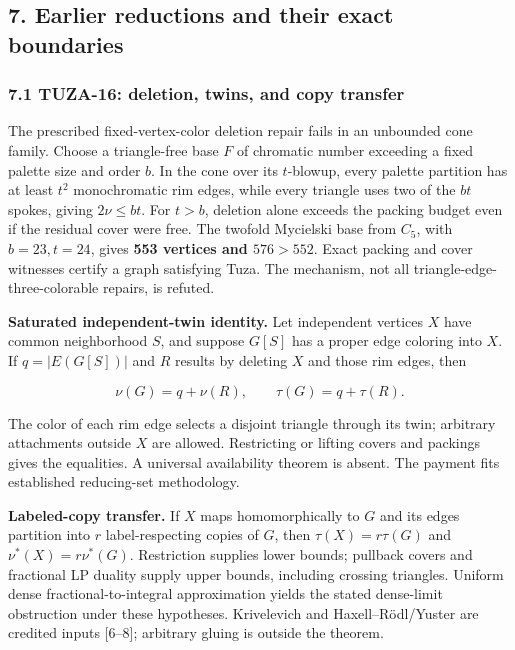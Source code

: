 \documentclass[11pt,a4paper]{article}
\begin{document}
\subsection{7. Earlier reductions and their exact boundaries}\label{earlier-reductions-and-their-exact-boundaries}

\subsubsection{7.1 TUZA-16: deletion, twins, and copy transfer}\label{tuza-16-deletion-twins-and-copy-transfer}

The prescribed fixed-vertex-color deletion repair fails in an unbounded cone family. Choose a triangle-free base \(F\) of chromatic number exceeding a fixed palette size and order \(b\). In the cone over its \(t\)-blowup, every palette partition has at least \(t^2\) monochromatic rim edges, while every triangle uses two of the \(bt\) spokes, giving \(2\nu\le bt\). For \(t>b\), deletion alone exceeds the packing budget even if the residual cover were free. The twofold Mycielski base from \(C_5\), with \(b=23,t=24\), gives \textbf{553 vertices and \(576>552\)}. Exact packing and cover witnesses certify a graph satisfying Tuza. The mechanism, not all triangle-edge-three-colorable repairs, is refuted.

\textbf{Saturated independent-twin identity.} Let independent vertices \(X\) have common neighborhood \(S\), and suppose \(G[S]\) has a proper edge coloring into \(X\). If \(q=|E(G[S])|\) and \(R\) results by deleting \(X\) and those rim edges, then

\[\nu(G)=q+\nu(R),\qquad\tau(G)=q+\tau(R).\]

The color of each rim edge selects a disjoint triangle through its twin; arbitrary attachments outside \(X\) are allowed. Restricting or lifting covers and packings gives the equalities. A universal availability theorem is absent. The payment fits established reducing-set methodology.

\textbf{Labeled-copy transfer.} If \(X\) maps homomorphically to \(G\) and its edges partition into \(r\) label-respecting copies of \(G\), then \(\tau(X)=r\tau(G)\) and \(\nu^*(X)=r\nu^*(G)\). Restriction supplies lower bounds; pullback covers and fractional LP duality supply upper bounds, including crossing triangles. Uniform dense fractional-to-integral approximation yields the stated dense-limit obstruction under these hypotheses. Krivelevich and Haxell--Rödl/Yuster are credited inputs {[}6--8{]}; arbitrary gluing is outside the theorem.
\end{document}
